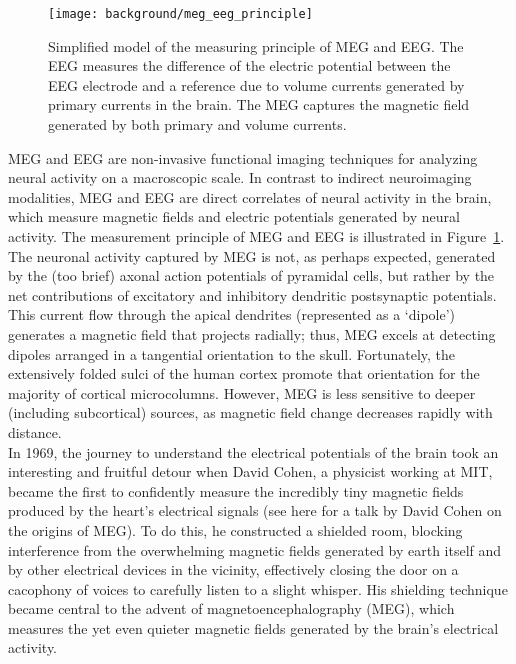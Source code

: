 \begin{figure}
	\texttt{[image: background/meg\_eeg\_principle]}
    \caption{Simplified model of the measuring principle of MEG and EEG. The EEG measures the difference of the electric potential between the EEG electrode and a reference due to volume currents generated by primary currents in the brain. The
MEG captures the magnetic field generated by both primary and volume currents.
    }
    \label{fig:meg_eeg_principle}
\end{figure}

MEG and EEG are non-invasive functional imaging techniques for analyzing neural activity on a macroscopic scale. In contrast to indirect neuroimaging modalities, MEG and EEG are direct correlates of neural activity in the brain, which measure magnetic fields and electric potentials generated by neural activity. The measurement principle of MEG and EEG is illustrated in Figure~\ref{fig:meg_eeg_principle}.\\

The neuronal activity captured by MEG is not, as perhaps expected, generated by the (too brief) axonal action potentials of pyramidal cells, but rather by the net contributions of excitatory and inhibitory dendritic postsynaptic potentials. This current flow through the apical dendrites (represented as a ‘dipole’) generates a magnetic field that projects radially; thus, MEG excels at detecting dipoles arranged in a tangential orientation to the skull. Fortunately, the extensively folded sulci of the human cortex promote that orientation for the majority of cortical microcolumns. However, MEG is less sensitive to deeper (including subcortical) sources, as magnetic field change decreases rapidly with distance.\\

In 1969, the journey to understand the electrical potentials of the brain took an interesting and fruitful detour when David Cohen, a physicist working at MIT, became the first to confidently measure the incredibly tiny magnetic fields produced by the heart's electrical signals (see here for a talk by David Cohen on the origins of MEG). To do this, he constructed a shielded room, blocking interference from the overwhelming magnetic fields generated by earth itself and by other electrical devices in the vicinity, effectively closing the door on a cacophony of voices to carefully listen to a slight whisper. His shielding technique became central to the advent of magnetoencephalography (MEG), which measures the yet even quieter magnetic fields generated by the brain's electrical activity.\\

